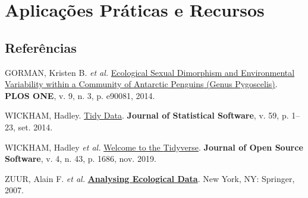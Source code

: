 \documentclass[
  12pt,
  letterpaper,
  DIV=11,
  numbers=noendperiod]{scrreprt}
\newlength{\cslhangindent}
\newenvironment{CSLReferences}[2] %
 {\begin{list}{}{%
  \setlength{\itemindent}{0pt}
  \setlength{\leftmargin}{0pt}
  \setlength{\parsep}{0pt}
  \ifodd #1
   \setlength{\leftmargin}{\cslhangindent}
   \setlength{\itemindent}{-1\cslhangindent}
  \fi
  \setlength{\itemsep}{#2\baselineskip}}}
 {\end{list}}
\begin{document}
\part{Aplicações Práticas e Recursos}


\chapter*{Referências}\label{referuxeancias}


\label{refs}
\begin{CSLReferences}{0}{1}
GORMAN, Kristen B. \emph{et al.}
\href{https://doi.org/10.1371/journal.pone.0090081}{Ecological {Sexual
Dimorphism} and {Environmental Variability} within a {Community} of
{Antarctic Penguins} ({Genus Pygoscelis})}. \textbf{PLOS ONE}, v. 9, n.
3, p. e90081, 2014.

WICKHAM, Hadley. \href{https://doi.org/10.18637/jss.v059.i10}{Tidy
{Data}}. \textbf{Journal of Statistical Software}, v. 59, p. 1--23, set.
2014.

WICKHAM, Hadley \emph{et al.}
\href{https://doi.org/10.21105/joss.01686}{Welcome to the {Tidyverse}}.
\textbf{Journal of Open Source Software}, v. 4, n. 43, p. 1686, nov.
2019.

ZUUR, Alain F. \emph{et al.}
\textbf{\href{https://doi.org/10.1007/978-0-387-45972-1}{Analysing
{Ecological Data}}}. New York, NY: Springer, 2007.

\end{CSLReferences}
\end{document}
